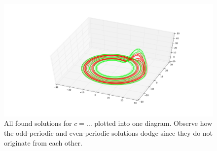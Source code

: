 \begin{figure}[!ht]
	\centering
	\includegraphics[width=1\textwidth]{img/roessler2b.pdf}
	\caption{All found solutions for $c=\dots$ plotted into one diagram.
	Observe how the odd-periodic and even-periodic solutions dodge since they do not
	originate from each other.}
\end{figure}



